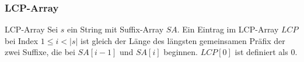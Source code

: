 \begin{frame}
    \frametitle{LCP-Array}


    \begin{block}{LCP-Array}
        Sei $s$ ein String mit Suffix-Array $SA$. 
		Ein Eintrag im LCP-Array $LCP$ bei Index $1 \leq i < |s|$ ist gleich 
		der Länge des längsten gemeinsamen Präfix der zwei Suffixe, 
		die bei $SA[i-1]$ und $SA[i]$ beginnen. $LCP[0]$ ist definiert als $0$.
    \end{block}

\end{frame}

